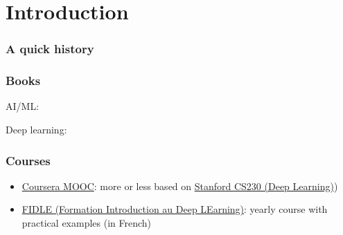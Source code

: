 \section{Introduction}

\begin{frame}
  \frametitle{A quick history}

\end{frame}

\begin{frame}
  \frametitle{Books}

  \nocite{*}

  AI/ML:
  \printbibliography[category=general]

  Deep learning:
  \printbibliography[category=deep_learning]
\end{frame}

\begin{frame}
  \frametitle{Courses}

  \begin{itemize}
  \item
    \href{https://www.coursera.org/specializations/machine-learning-introduction}{Coursera
      MOOC}:
    more or less based on \href{https://cs230.stanford.edu/}{Stanford CS230 (Deep Learning)})
  \item \href{https://fidle.cnrs.fr/}{FIDLE (Formation Introduction au Deep LEarning)}: yearly course with practical examples (in French)
  \end{itemize}
\end{frame}
